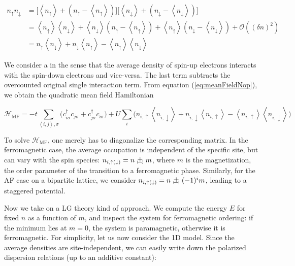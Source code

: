 \begin{equation}\label{eq:meanFieldNop}
\begin{split}
n_\uparrow n_\downarrow &= \bigg[ \left\langle n_\uparrow \right\rangle + ( n_\uparrow - \left\langle n_\uparrow \right\rangle ) \bigg] \bigg[ \left\langle n_\downarrow \right\rangle + ( n_\downarrow - \left\langle n_\downarrow \right\rangle ) \bigg] \\
&= \left\langle n_\uparrow \right\rangle \left\langle n_\downarrow \right\rangle + \left\langle n_\downarrow \right\rangle ( n_\uparrow - \left\langle n_\uparrow \right\rangle ) + \left\langle n_\uparrow \right\rangle ( n_\downarrow - \left\langle n_\downarrow \right\rangle ) + \mathcal{O}((\delta n)^2) \\
&= n_\uparrow \left\langle n_\downarrow \right\rangle + n_\downarrow \left\langle n_\uparrow \right\rangle - \left\langle n_\uparrow \right\rangle \left\langle n_\downarrow \right\rangle
\end{split}
\end{equation}

We consider a  in the sense that the average density of spin-up electrons interacts with the spin-down electrons and vice-versa.
The last term subtracts the overcounted original single interaction term.
From equation (\ref{eq:meanFieldNop}), we obtain the quadratic mean field Hamiltonian

\begin{equation}
\mathcal{H}_{\text{MF}} = - t \sum_{\left\langle i, j \right\rangle, \sigma} \bigg( c_{i\sigma}^\dagger c_{j\sigma} + c_{j\sigma}^\dagger c_{i\sigma} \bigg) + U \sum_i \bigg( n_{i,\uparrow} \left\langle n_{i, \downarrow} \right\rangle + n_{i, \downarrow} \left\langle n_{i, \uparrow} \right\rangle - \left\langle n_{i, \uparrow} \right\rangle \left\langle n_{i, \downarrow} \right\rangle \bigg)
\end{equation}

To solve $\mathcal{H}_{\text{MF}}$, one merely has to diagonalize the corresponding matrix.
In the ferromagnetic case, the average occupation is independent of the specific site, but can vary with the spin species: $n_{i, \uparrow(\downarrow)} = n \Pm m$, where $m$ is the magnetization, the order parameter of the transition to a ferromagnetic phase.
Similarly, for the \acs{AF} case on a bipartite lattice, we consider $n_{i, \uparrow(\downarrow)} = n \Pm (-1)^{i} m$, leading to a staggered potential.

Now we take on a \acl{LG} theory kind of approach.
We compute the energy $E$ for fixed $n$ as a function of $m$, and inspect the system for ferromagnetic ordering: if the minimum lies at $m = 0$, the system is paramagnetic, otherwise it is ferromagnetic.
For simplicity, let us now consider the \acs{1D} model.
Since the average densities are site-independent, we can easily write down the polarized dispersion relations (up to an additive constant):

